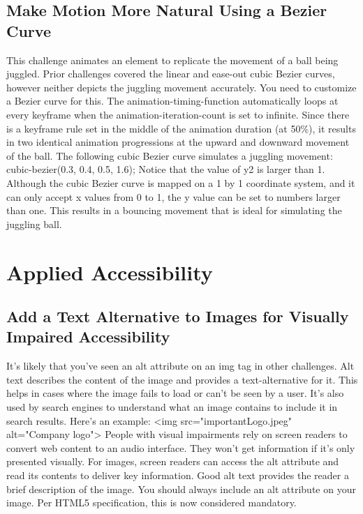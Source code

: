 \documentclass{article}%
\begin{document}
\subsection{Make Motion More Natural Using a Bezier Curve}%
\label{subsec:MakeMotionMoreNaturalUsingaBezierCurve}%
This challenge animates an element to replicate the movement of a ball being juggled. Prior challenges covered the linear and ease{-}out cubic Bezier curves, however neither depicts the juggling movement accurately. You need to customize a Bezier curve for this.\newline%
The animation{-}timing{-}function automatically loops at every keyframe when the animation{-}iteration{-}count is set to infinite. Since there is a keyframe rule set in the middle of the animation duration (at 50\%), it results in two identical animation progressions at the upward and downward movement of the ball.\newline%
The following cubic Bezier curve simulates a juggling movement:\newline%
cubic{-}bezier(0.3, 0.4, 0.5, 1.6); \newline%
Notice that the value of y2 is larger than 1. Although the cubic Bezier curve is mapped on a 1 by 1 coordinate system, and it can only accept x values from 0 to 1, the y value can be set to numbers larger than one. This results in a bouncing movement that is ideal for simulating the juggling ball.\newline%

%
\newpage%
\section{Applied Accessibility}%
\label{sec:AppliedAccessibility}%
\subsection{Add a Text Alternative to Images for Visually Impaired Accessibility}%
\label{subsec:AddaTextAlternativetoImagesforVisuallyImpairedAccessibility}%
It's likely that you've seen an alt attribute on an img tag in other challenges. Alt text describes the content of the image and provides a text{-}alternative for it. This helps in cases where the image fails to load or can't be seen by a user. It's also used by search engines to understand what an image contains to include it in search results. Here's an example:\newline%
<img src="importantLogo.jpeg" alt="Company logo">\newline%
People with visual impairments rely on screen readers to convert web content to an audio interface. They won't get information if it's only presented visually. For images, screen readers can access the alt attribute and read its contents to deliver key information.\newline%
Good alt text provides the reader a brief description of the image. You should always include an alt attribute on your image. Per HTML5 specification, this is now considered mandatory.\newline%
\end{document}

